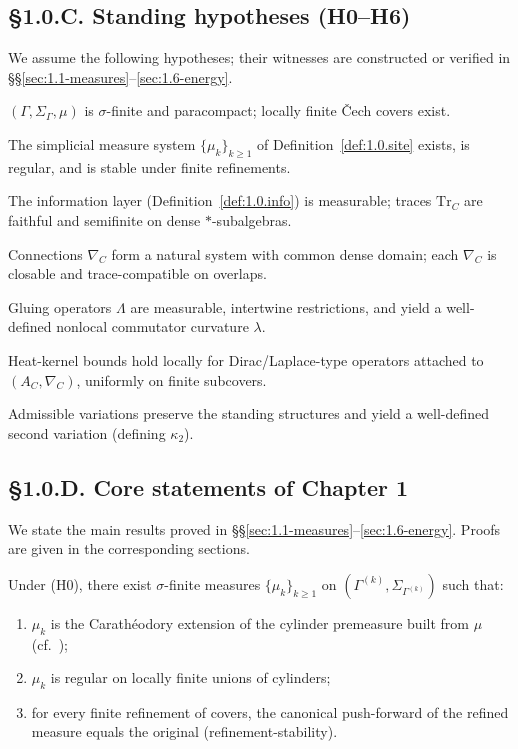 \subsection*{§1.0.C. Standing hypotheses (H0–H6)}
We assume the following hypotheses; their witnesses are constructed or verified in §§\ref{sec:1.1-measures}–\ref{sec:1.6-energy}.

\begin{description}[leftmargin=1.6em,labelsep=0.6em]
\item[\textbf{(H0)}] $(\Gamma,\Sigma_\Gamma,\mu)$ is $\sigma$-finite and paracompact; locally finite Čech covers exist.
\item[\textbf{(H1)}] The simplicial measure system $\{\mu_k\}_{k\ge1}$ of Definition~\ref{def:1.0.site} exists, is regular, and is stable under finite refinements.
\item[\textbf{(H2)}] The information layer (Definition~\ref{def:1.0.info}) is measurable; traces $\mathrm{Tr}_C$ are faithful and semifinite on dense $*$-subalgebras.
\item[\textbf{(H3)}] Connections $\nabla_C$ form a natural system with common dense domain; each $\nabla_C$ is closable and trace-compatible on overlaps.
\item[\textbf{(H4)}] Gluing operators $\Lambda$ are measurable, intertwine restrictions, and yield a well-defined nonlocal commutator curvature $\lambda$.
\item[\textbf{(H5)}] Heat-kernel bounds hold locally for Dirac/Laplace-type operators attached to $(A_C,\nabla_C)$, uniformly on finite subcovers.
\item[\textbf{(H6)}] Admissible variations preserve the standing structures and yield a well-defined second variation (defining $\kappa_2$).
\end{description}

\subsection*{§1.0.D. Core statements of Chapter 1}
We state the main results proved in §§\ref{sec:1.1-measures}–\ref{sec:1.6-energy}. 
Proofs are given in the corresponding sections.

\begin{theorem}\label{thm:1.0.measures}
Under \textup{(H0)}, there exist $\sigma$-finite measures $\{\mu_k\}_{k\ge1}$ on $(\Gamma^{(k)},\Sigma_{\Gamma^{(k)}})$ such that:
\begin{enumerate}
\item $\mu_k$ is the Carathéodory extension of the cylinder premeasure built from $\mu$ (cf.\ \cite{Halmos,Bogachev1});
\item $\mu_k$ is regular on locally finite unions of cylinders;
\item for every finite refinement of covers, the canonical push-forward of the refined measure equals the original (refinement-stability).
\end{enumerate}
\end{theorem}

